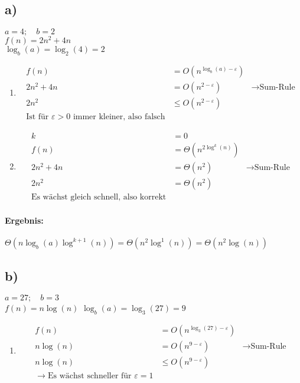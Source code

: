 \documentclass[12pt,letterpaper]{article}
\begin{document}
\subsection*{a)}
$a = 4;\quad b = 2$ \\
$f(n) =  2n^2 + 4n$ \\
$\log_b(a) = \log_2(4) = 2$
\begin{enumerate}
    \item \begin{align*}
              f(n)      & = O(n^{\log_b(a) - \varepsilon})                               \\
              2n^2 + 4n & = O(n^{2 - \varepsilon})         & \rightarrow \text{Sum-Rule} \\
              2n^2      & \leq O(n^{2 - \varepsilon})                                    \\
              \text{Ist für } \varepsilon > 0 \text{ immer kleiner, also falsch}
          \end{align*}
    \item \begin{align*}
              k         & = 0                                                    \\
              f(n)      & = \Theta(n^{2\log^k(n)})                               \\
              2n^2 + 4n & = \Theta(n^2)            & \rightarrow \text{Sum-Rule} \\
              2n^2      & = \Theta(n^2)                                          \\
              \text{Es wächst gleich schnell, also korrekt}
          \end{align*}
\end{enumerate}
\paragraph{Ergebnis:}
$ \Theta(n \log_b(a)\log^{k+1}(n)) = \Theta(n^2 \log^1(n)) = \Theta(n^2 \log(n))$


\subsection*{b)}
$a = 27;\quad b = 3$ \\
$f(n) =  n \log(n)$
$\log_b(a) = \log_3(27) = 9$
\begin{enumerate}
    \item \begin{align*}
              f(n)      & = O(n^{\log_3(27) - \varepsilon})                               \\
              n \log(n) & = O(n^{9 - \varepsilon})          & \rightarrow \text{Sum-Rule} \\
              n \log(n) & \leq O(n^{9 - \varepsilon})                                     \\
              \rightarrow \text{Es wächst schneller für } \varepsilon = 1
          \end{align*}
\end{enumerate}
\end{document}
